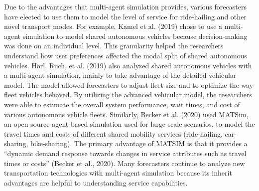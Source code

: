 \documentclass[fancy, masters]{byuthesis}
\begin{document}
Due to the advantages that multi-agent simulation provides, various forecasters have elected to use them to model the level of service for ride-hailing and other novel transport modes. For example, Kamel et al. (2019) chose to use a multi-agent simulation to model shared autonomous vehicles because decision-making was done on an individual level. This granularity helped the researchers understand how user preferences affected the modal split of shared autonomous vehicles. Hörl, Ruch, et al. (2019) also analyzed shared autonomous vehicles with a multi-agent simulation, mainly to take advantage of the detailed vehicular model. The model allowed forecasters to adjust fleet size and to optimize the way fleet vehicles behaved. By utilizing the advanced vehicular model, the researchers were able to estimate the overall system performance, wait times, and cost of various autonomous vehicle fleets. Similarly, Becker et al. (2020) used MATSim, an open source agent-based simulation used for large scale scenarios, to model the travel times and costs of different shared mobility services (ride-hailing, car-sharing, bike-sharing). The primary advantage of MATSIM is that it provides a ``dynamic demand response towards changes in service attributes such as travel times or costs'' (Becker et al., 2020). Many forecasters continue to analyze new transportation technologies with multi-agent simulation because its inherit advantages are helpful to understanding service capabilities.
\end{document}
